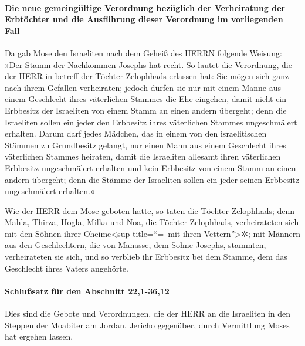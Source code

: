 \hypertarget{die-neue-gemeinguxfcltige-verordnung-bezuxfcglich-der-verheiratung-der-erbtuxf6chter-und-die-ausfuxfchrung-dieser-verordnung-im-vorliegenden-fall}{%
\paragraph{Die neue gemeingültige Verordnung bezüglich der Verheiratung
der Erbtöchter und die Ausführung dieser Verordnung im vorliegenden
Fall}\label{die-neue-gemeinguxfcltige-verordnung-bezuxfcglich-der-verheiratung-der-erbtuxf6chter-und-die-ausfuxfchrung-dieser-verordnung-im-vorliegenden-fall}}

Da gab Mose den Israeliten nach dem Geheiß des HERRN
folgende Weisung: »Der Stamm der Nachkommen Josephs hat recht.
So lautet die Verordnung, die der HERR in betreff der
Töchter Zelophhads erlassen hat: Sie mögen sich ganz nach ihrem Gefallen
verheiraten; jedoch dürfen sie nur mit einem Manne aus einem Geschlecht
ihres väterlichen Stammes die Ehe eingehen, damit nicht
ein Erbbesitz der Israeliten von einem Stamm an einen andern übergeht;
denn die Israeliten sollen ein jeder den Erbbesitz ihres väterlichen
Stammes ungeschmälert erhalten. Darum darf jedes Mädchen,
das in einem von den israelitischen Stämmen zu Grundbesitz gelangt, nur
einen Mann aus einem Geschlecht ihres väterlichen Stammes heiraten,
damit die Israeliten allesamt ihren väterlichen Erbbesitz ungeschmälert
erhalten und kein Erbbesitz von einem Stamm an einen
andern übergeht; denn die Stämme der Israeliten sollen ein jeder seinen
Erbbesitz ungeschmälert erhalten.«

Wie der HERR dem Mose geboten hatte, so taten die Töchter
Zelophhads; denn Mahla, Thirza, Hogla, Milka und Noa, die
Töchter Zelophhads, verheirateten sich mit den Söhnen ihrer
Oheime\textless sup title=``=~mit ihren Vettern''\textgreater✲;
mit Männern aus den Geschlechtern, die von Manasse, dem
Sohne Josephs, stammten, verheirateten sie sich, und so verblieb ihr
Erbbesitz bei dem Stamme, dem das Geschlecht ihres Vaters angehörte.

\hypertarget{schluuxdfsatz-fuxfcr-den-abschnitt-221-3612}{%
\paragraph{Schlußsatz für den Abschnitt
22,1-36,12}\label{schluuxdfsatz-fuxfcr-den-abschnitt-221-3612}}

Dies sind die Gebote und Verordnungen, die der HERR an
die Israeliten in den Steppen der Moabiter am Jordan, Jericho gegenüber,
durch Vermittlung Moses hat ergehen lassen.
